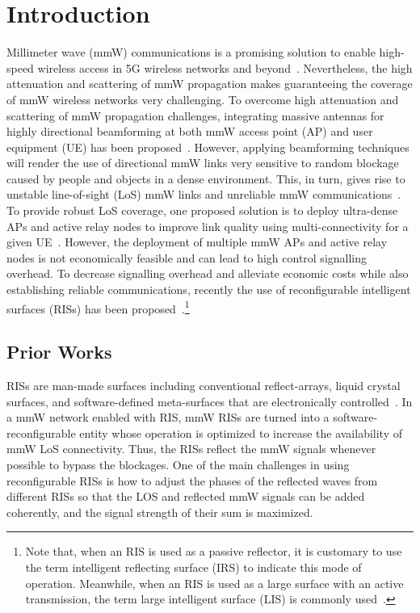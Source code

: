 \documentclass[conference]{IEEEtran}
\begin{document}
\section{Introduction}\label{sec:Intro}
Millimeter wave (mmW) communications is a promising solution to enable high-speed wireless access in 5G wireless networks and beyond~\cite{Walid2019,Petrov2017}. Nevertheless, the high attenuation and scattering of mmW propagation makes guaranteeing the coverage of mmW wireless networks very challenging. To overcome high attenuation and scattering of mmW propagation challenges, integrating massive antennas for highly directional beamforming at both mmW access point (AP) and user equipment (UE) has been proposed~\cite{Walid2019}. However, applying beamforming techniques will render the use of directional mmW links very sensitive to random blockage caused by people and objects in a dense environment. This, in turn, gives rise to unstable line-of-sight (LoS) mmW links and unreliable mmW communications~\cite{Petrov2017}. To provide robust LoS coverage, one proposed solution is to deploy ultra-dense APs and active relay nodes to improve link quality using multi-connectivity for a given UE~\cite{Petrov2017,Abari2018,Journal2019,Chaccour2}. However, the deployment of multiple mmW APs and active relay nodes is not economically feasible and can lead to high control signalling overhead. To decrease signalling overhead and alleviate economic costs while also establishing reliable communications, recently the use of reconfigurable intelligent surfaces (RISs) has been proposed~\cite{Walid2019,Huang2018,Christos2018,Basar2019,Zhang2019,Chaccour1}.\footnote{Note that, when an RIS is used as a passive reflector, it is customary to use the term intelligent reflecting surface (IRS) to indicate this mode of operation. Meanwhile, when an RIS is used as a large surface with an active transmission, the term large intelligent surface (LIS) is commonly used~\cite{Huang2018,Basar2019,Zhang2019}.}
\vspace{-0.1cm}
\subsection{Prior Works}
RISs are man-made surfaces including conventional reflect-arrays, liquid crystal surfaces, and software-defined meta-surfaces that are electronically controlled~\cite{Walid2000}. In a mmW network enabled with RIS, mmW RISs are turned into a software-reconfigurable entity whose operation is optimized to increase the availability of mmW LoS connectivity. Thus, the RISs reflect the mmW signals whenever possible to bypass the blockages. One of the main challenges in using reconfigurable RISs is how to adjust the phases of the reflected waves from different RISs so that the LOS and reflected mmW signals can be added coherently, and the signal strength of their sum is maximized.
\end{document}
